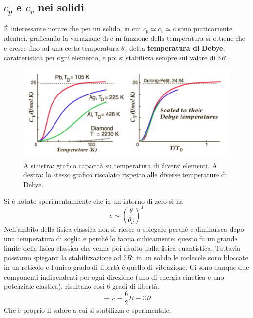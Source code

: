 \documentclass[
10pt, %
a4paper, %
oneside, %
headinclude,footinclude, %
BCOR5mm, %
]{scrartcl}
\begin{document}
\subsection{\(c_p\) e \(c_v\) nei solidi}
\'{E} interessante notare che per un solido, in cui \(c_p\simeq c_v\simeq c\) sono praticamente identici, graficando la variazione di c in funzione della temperatura si ottiene che c cresce fino ad una certa temperatura \(\theta_d\) detta \textbf{temperatura di Debye}, caratteristica per ogni elemento, e poi si stabilizza sempre sul valore di \(3R\). 
\begin{figure}[h!]
	\centering
	\includegraphics[width=0.7\linewidth]{../images/debye_temperature}
	\caption{A sinistra: grafico capacità su temperatura di diversi elementi. A destra: lo stesso grafico riscalato rispetto alle diverse temperature di Debye.}
	\label{fig:debyetemperature}
\end{figure}
\FloatBarrier
Si è notato sperimentalmente che in un intorno di zero si ha \[c \sim \left(\frac{\theta}{\theta_d}\right)^3\]
Nell'ambito della fisica classica non si riesce a spiegare perché c diminuisca dopo una temperatura di soglia e perché lo faccia cubicamente; questo fu un grande limite della fisica classica che venne poi risolto dalla fisica quantistica. Tuttavia possiamo spiegarci la stabilizzazione ad $3R$: in un solido le molecole sono bloccate in un reticolo e l'unico grado di libertà è quello di vibrazione. Ci sono dunque due componenti indipendenti per ogni direzione (uno di energia cinetica e uno potenziale elastica), risultano così 6 gradi di libertà.
\[\Rightarrow c = \frac{6}{2}R = 3R\] 
Che è proprio il valore a cui si stabilizza c sperimentale. 
\end{document}
